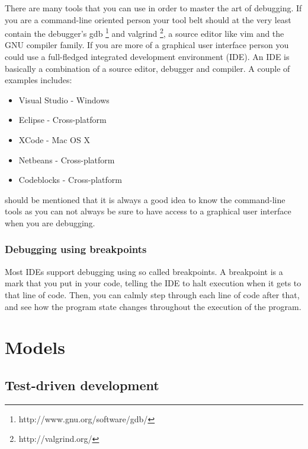 \documentclass[11pt,a4paper,twoside]{article}
\begin{document}
There are many tools that you can use in order to master the art of debugging.
If you are a command-line oriented person your tool belt should at the very
least contain the debugger's gdb \footnote{http://www.gnu.org/software/gdb/}
and valgrind \footnote{http://valgrind.org/}, a source editor like vim and the
GNU compiler family. If you are more of a graphical user interface person you
could use a full-fledged integrated development environment (IDE). An IDE is
basically a combination of a source editor, debugger and compiler. A couple of
examples includes:

\begin{itemize}
\item Visual Studio - Windows
\item Eclipse - Cross-platform
\item XCode - Mac OS X
\item Netbeans - Cross-platform
\item Codeblocks - Cross-platform
\end{itemize}


 should be mentioned that it is always a good idea to know the
command-line tools as you can not always be sure to have access to a graphical
user interface when you are debugging.  

\subsubsection{Debugging using breakpoints}

Most IDEs support debugging using so called breakpoints. A breakpoint is a mark
that you put in your code, telling the IDE to halt execution when it gets to
that line of code. Then, you can calmly step through each line of code after
that, and see how the program state changes throughout the execution of the
program.


\section{Models}

\subsection{Test-driven development}
\end{document}
